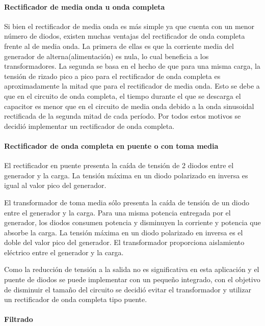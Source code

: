 \paragraph{Rectificador de media onda u onda completa}

Si bien el rectificador de media onda es más simple ya que cuenta con un menor número de diodos,
existen muchas ventajas del rectificador de onda completa frente al de media onda. 
La primera de ellas es que la corriente media del generador de alterna(alimentación) es nula,
lo cual beneficia a los transformadores. 
La segunda se basa en el hecho de que para una misma carga,
la tensión de rizado pico a pico para el rectificador de onda completa
es aproximadamente la mitad que para el rectificador de media onda. 
Esto se debe a que en el circuito de onda completa,
el tiempo durante el que se descarga el capacitor es menor que en el circuito de media onda
debido a la onda sinusoidal rectificada de la segunda mitad de cada período. 
Por todos estos motivos se decidió implementar un rectificador de onda completa.

\paragraph{Rectificador de onda completa en puente o con toma media}

El rectificador en puente presenta la caída de tensión de 2 diodos entre el generador y la carga. 
La tensión máxima en un diodo polarizado en inversa es igual al valor pico del generador.

El transformador de toma media sólo presenta la caída de tensión de un diodo entre el generador y la carga. 
Para una misma potencia entregada por el generador, los diodos consumen potencia y disminuyen la corriente y potencia que absorbe la carga. 
La tensión máxima en un diodo polarizado en inversa es el doble del valor pico del generador.
El transformador proporciona aislamiento eléctrico entre el generador y la carga. 

Como la reducción de tensión a la salida no es significativa en esta aplicación
y el puente de diodos se puede implementar con un pequeño integrado,
con el objetivo de disminuir el tamaño del circuito se decidió evitar el transformador
y utilizar un rectificador de onda completa tipo puente.

\paragraph{Filtrado}

